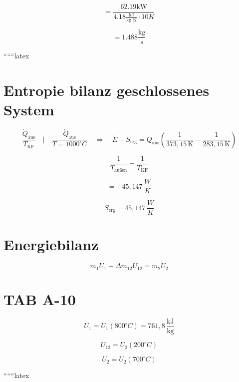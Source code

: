 \[
= \frac{62.19 \text{kW}}{4.18 \frac{\text{kJ}}{\text{kg K}} \cdot 10 K}
\]

\[
= 1.488 \frac{\text{kg}}{\text{s}}
\]

``````latex

\section*{Entropie bilanz geschlossenes System}

\[
\frac{\dot{Q}_{\text{aus}}}{T_{\text{KF}}} \quad \Bigg\lvert \quad \frac{\dot{Q}_{\text{aus}}}{T=1000^\circ C} \quad \Rightarrow \quad \dot{E} - \dot{S}_{\text{erg}} = \dot{Q}_{\text{aus}} \left( \frac{1}{373,15 \, \text{K}} - \frac{1}{283,15 \, \text{K}} \right)
\]

\[
\frac{1}{T_{\text{außen}}} - \frac{1}{T_{\text{KF}}}
\]

\[
= -45,147 \, \frac{W}{K}
\]

\[
\dot{S}_{\text{erg}} = 45,147 \, \frac{W}{K}
\]

\section*{Energiebilanz}

\[
m_1 U_1 + \Delta m_{12} U_{12} = m_2 U_2
\]

\section*{TAB A-10}

\[
U_1 = U_1(800^\circ C) = 761,8 \, \frac{\text{kJ}}{\text{kg}}
\]

\[
U_{12} = U_2(200^\circ C)
\]

\[
U_2 = U_2(700^\circ C)
\]

``````latex


